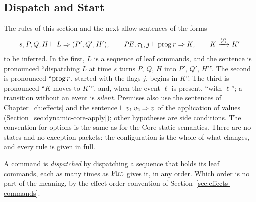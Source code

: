 \subsection{Dispatch and Start}\label{sec:programs-dispatch}

The rules of this section and the next allow sentences of the forms
\[
  s,P,Q,H \vdash L \Rightarrow (P',Q',H'),\qquad
  \mathit{PE},\tau_1,j \vdash \mathrm{prog}\,r \Rightarrow K,\qquad
  K\xrightarrow{\langle \ell\rangle}K'
\]
to be inferred. In the first, $L$ is a sequence of leaf commands, and the
sentence is pronounced ``dispatching $L$ at time $s$ turns $P$, $Q$, $H$ into
$P'$, $Q'$, $H'$''. The second is pronounced ``$\mathrm{prog}\,r$, started with
the flags $j$, begins in $K$''. The third is pronounced ``$K$ moves to $K'$'',
and, when the event $\ell$ is present, ``with $\ell$''; a transition without
an event is \emph{silent}. Premises also use the sentences of
Chapter~\ref{ch:effects} and the sentence $\vdash v_1\,v_2 \Rightarrow v$ of the
application of values (Section~\ref{sec:dynamic-core-apply}); other
hypotheses are side conditions. The convention for options is the same as for
the Core static semantics. There are no states and no exception packets: the
configuration is the whole of what changes, and every rule is given in full.

A command is \emph{dispatched} by dispatching a sequence that holds its leaf
commands, each as many times as $\mathrm{Flat}$ gives it, in any order. Which
order is no part of the meaning, by the effect order convention of
Section~\ref{sec:effects-commands}. %


  {}

  {}

  {}

  {}

